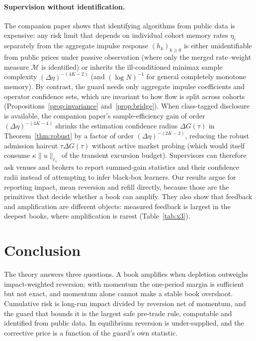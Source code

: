 \documentclass[12pt]{article}
\theoremstyle{definition}
\theoremstyle{remark}
\begin{document}
\paragraph{Supervision without identification.} The companion paper shows that identifying algorithms from public data is expensive: any risk limit that depends on individual cohort memory rates $\eta_i$ separately from the aggregate impulse response $(h_k)_{k\ge 0}$ is either unidentifiable from public prices under passive observation (where only the merged rate--weight measure $\mathcal M$ is identified) or inherits the ill-conditioned minimax sample complexity $(\Delta\eta)^{-(4K-2)}$ (and $(\log N)^{-1}$ for general completely monotone memory). By contrast, the guard needs only aggregate impulse coefficients and operator confidence sets, which are invariant to how flow is split across cohorts (Propositions~\ref{prop:invariance} and~\ref{prop:bridge}). When class-tagged disclosure is available, the companion paper's sample-efficiency gain of order $(\Delta\eta)^{-(4K-4)}$ shrinks the estimation confidence radius $\Delta G(\tau)$ in Theorem~\ref{thm:robust} by a factor of order $(\Delta\eta)^{-(2K-2)}$, reducing the robust admission haircut $\tau\Delta G(\tau)$ without active market probing (which would itself consume $\kappa\|u\|_{\ell_1}$ of the transient excursion budget). Supervisors can therefore ask venues and brokers to report summed-gain statistics and their confidence radii instead of attempting to infer black-box learners. Our results argue for reporting impact, mean reversion and refill directly, because those are the primitives that decide whether a book can amplify. They also show that feedback and amplification are different objects: measured feedback is largest in the deepest books, where amplification is rarest (Table~\ref{tab:x3}).

\section{Conclusion}\label{sec:conclusion}

The theory answers three questions. A book amplifies when depletion outweighs impact-weighted reversion; with momentum the one-period margin is sufficient but not exact, and momentum alone cannot make a stable book overshoot. Cumulative risk is long-run impact divided by reversion net of momentum, and the guard that bounds it is the largest safe pre-trade rule, computable and identified from public data. In equilibrium reversion is under-supplied, and the corrective price is a function of the guard's own statistic.
\end{document}

